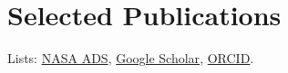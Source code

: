 \documentclass[11pt]{article}
\begin{document}
\section*{Selected Publications}
Lists: \href{\adslibrary}{NASA ADS}, \href{\googlescholar}{Google Scholar}, \href{https://orcid.org/0000-0002-2514-5965}{ORCID}.


\begin{etaremune}[leftmargin=1.25em]

\end{etaremune}
\end{document}
